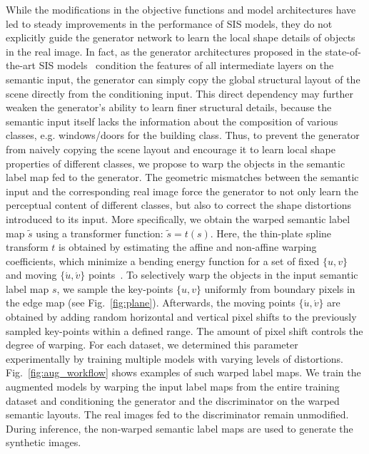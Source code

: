 \documentclass[final]{cvpr}
\newcommand\+{\mkern4mu}
\begin{document}
While the modifications in the objective functions and model architectures \cite{isola2017image,wang2018high,park2019semantic,liu2019learning,tang2019local} have led to steady improvements in the performance of SIS models, they do not explicitly guide the generator network to learn the local shape details of objects in the real image. In fact, as the generator architectures proposed in the state-of-the-art SIS models~\cite{liu2019learning,park2019semantic} condition the features of all intermediate layers on the semantic input, the generator can simply copy the global structural layout of the scene directly from the conditioning input. This direct dependency may further weaken the generator's ability to learn finer structural details, because the semantic input itself lacks the information about the composition of various classes, e.g. windows/doors for the building class. Thus, to prevent the generator from naively copying the scene layout and encourage it to learn local shape properties of different classes, we propose to warp the objects in the semantic label map fed to the generator. The geometric mismatches between the semantic input and the corresponding real image force the generator to not only learn the perceptual content of different classes, but also to correct the shape distortions introduced to its input. More specifically, we obtain the warped semantic label map $\tilde{s}$ using a transformer function:
$\tilde{s} = t(s)\text{.}$
Here, the thin-plate spline transform $t$ is obtained by estimating the affine and non-affine warping coefficients, which minimize a bending energy function for a set of fixed $\{u, v\}$ and moving $\{\acute{u}, \acute{v}\}$ points~\cite{bookstein1989principal}. To selectively warp the objects in the input semantic label map $s$, we sample the key-points $\{u, v\}$ uniformly from boundary pixels in the edge map (see Fig.~\ref{fig:plane}). Afterwards, the moving points $\{\acute{u}, \acute{v}\}$ are obtained by adding random horizontal and vertical pixel shifts to the previously sampled key-points within a defined range. The amount of pixel shift controls the degree of warping. For each dataset, we determined this parameter experimentally by training multiple models with varying levels of distortions. Fig.~\ref{fig:aug_workflow} shows examples of such warped label maps. We train the augmented models by warping the input label maps from the entire training dataset and conditioning the generator and the discriminator on the warped semantic layouts. The real images fed to the discriminator remain unmodified. During inference, the non-warped semantic label maps are used to generate the synthetic images.
 
\end{document}
